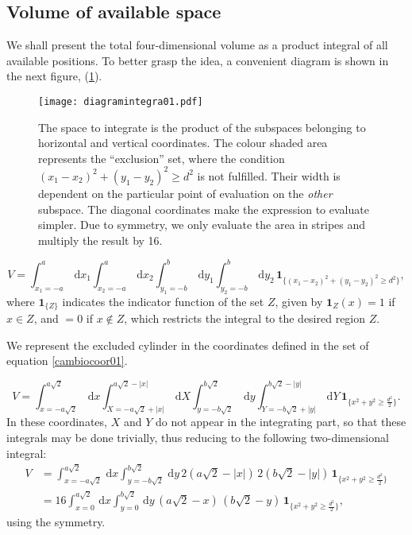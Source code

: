 \documentclass[a4paper,10pt, jcp, aps, preprint]{revtex4-1}
\newcommand{\rd}{\, \mathrm{d}}
\newcommand{\indicator}[1]{\mathbf{1}_{ \{   #1 \} } }
\begin{document}
\subsection{Volume of available space}

We shall present the total four-dimensional volume as a product integral
of all available positions. To better grasp the idea, a convenient
diagram is shown in the next figure, (\ref{diagintegra01}).

\begin{figure}[h]
  \centering
  \texttt{[image: diagramintegra01.pdf]}
  \caption{The space to integrate is the product of the subspaces
    belonging to horizontal and vertical coordinates. The colour
    shaded area represents the ``exclusion'' set, where the condition 
    $ (x_1-x_2)^2 + (y_1-y_2)^2 \ge d^2 $ is not fulfilled. 
    Their width is dependent on the particular point of evaluation
    on the \emph{other} subspace. The diagonal coordinates
    make the expression to evaluate simpler. Due to 
    symmetry, we only evaluate the area in stripes and
    multiply the result by 16.}\label{diagintegra01}
\end{figure}

\begin{equation}\label{volindic}
 V = \int_{x_1 = -a}^a \rd x_1 \int_{x_2 = -a}^a \rd x_2 
\int_{y_1 = -b}^b \rd y_1 \int_{y_2 = -b}^b \rd y_2 \, \indicator{ (x_1-x_2)^2 + (y_1-y_2)^2 \ge d^2 },
\end{equation}
where $\indicator{Z}$ indicates the indicator function of the set $Z$, given by $\mathbf{1}_Z (x) = 1$ if $x \in Z$, and $=0$ if $x \notin Z$, which restricts the integral to the desired region $Z$.

We represent the excluded cylinder in the coordinates defined in 
the set of equation \ref{cambiocoor01}. 

\begin{equation}\label{integraltotal}
 V = \int_{x=-a \sqrt{2}}^{a \sqrt{2}} \rd x 
\int_{X=-a \sqrt{2} + |x| }^{a \sqrt{2} - |x|}  \rd X
 \int_{y=-b \sqrt{2}}^{b \sqrt{2}} \rd y
\int_{Y=-b \sqrt{2} + |y| }^{b \sqrt{2}-|y|}  \rd Y
\, \indicator{ x^2 + y^2 \ge \frac{d^2}{2}  }.
\end{equation}
In these coordinates, $X$ and $Y$ do not appear in the integrating part, so that these integrals may be done trivially, thus reducing to the following two-dimensional integral:
\begin{align}
 V &= \int_{x=-a \sqrt{2}}^{a \sqrt{2}} \rd x  \int_{y=-b \sqrt{2}}^{b \sqrt{2}} \rd y
\, 2 \left( a \sqrt{2} - |x| \right) \, 2 \left( b \sqrt{2} - |y| \right) \,  \indicator{ x^2 + y^2 \ge \frac{d^2}{2} } \\
&= 16 \int_{x=0}^{a \sqrt{2}} \rd x  \int_{y=0}^{b \sqrt{2}} \rd y
\, \left( a \sqrt{2} - x \right) \, \left( b \sqrt{2} - y \right) \,  \indicator{ x^2 + y^2 \ge \frac{d^2}{2} },
\end{align}
using the symmetry.
\end{document}
